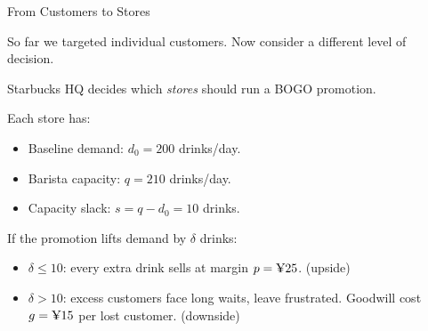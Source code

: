 \documentclass[aspectratio=169, 11pt, handout]{beamer}
\begin{document}
 
\begin{frame}{From Customers to Stores}
 
So far we targeted individual customers. Now consider a different level of decision.
 
\bigskip
 
Starbucks HQ decides which \emph{stores} should run a BOGO promotion.
 
\bigskip
 
Each store has:
\begin{itemize}
    \item Baseline demand: $d_0 = 200$ drinks/day.
    \item Barista capacity: $q = 210$ drinks/day.
    \item Capacity slack: $s = q - d_0 = 10$ drinks.
\end{itemize}
 
\pause
\bigskip
 
If the promotion lifts demand by $\delta$ drinks:
\begin{itemize}
    \item $\delta \leq 10$: every extra drink sells at margin $p = \text{\textyen}25$. \hfill (upside)
    \item $\delta > 10$: excess customers face long waits, leave frustrated. Goodwill cost $g = \text{\textyen}15$ per lost customer. \hfill (downside)
\end{itemize}
 
\end{frame}
 
\end{document}
